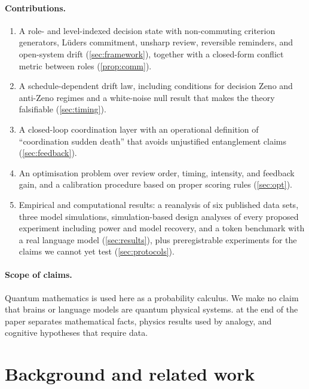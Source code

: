 \documentclass[11pt]{article}
\theoremstyle{definition}
\theoremstyle{remark}
\begin{document}
\paragraph{Contributions.}
\begin{enumerate}
\item A role- and level-indexed decision state with non-commuting criterion generators, L\"uders commitment, unsharp review, reversible reminders, and open-system drift (\cref{sec:framework}), together with a closed-form conflict metric between roles (\cref{prop:comm}).
\item A schedule-dependent drift law, including conditions for decision Zeno and anti-Zeno regimes and a white-noise null result that makes the theory falsifiable (\cref{sec:timing}).
\item A closed-loop coordination layer with an operational definition of ``coordination sudden death'' that avoids unjustified entanglement claims (\cref{sec:feedback}).
\item An optimisation problem over review order, timing, intensity, and feedback gain, and a calibration procedure based on proper scoring rules (\cref{sec:opt}).
\item Empirical and computational results: a reanalysis of six published data sets, three model simulations, simulation-based design analyses of every proposed experiment including power and model recovery, and a token benchmark with a real language model (\cref{sec:results}), plus preregistrable experiments for the claims we cannot yet test (\cref{sec:protocols}).
\end{enumerate}

\paragraph{Scope of claims.} Quantum mathematics is used here as a probability calculus. We make no claim that brains or language models are quantum physical systems.  at the end of the paper separates mathematical facts, physics results used by analogy, and cognitive hypotheses that require data.

\section{Background and related work}
\label{sec:related}
\end{document}
